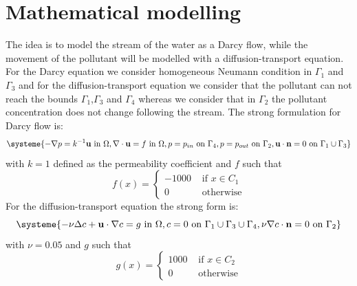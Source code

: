 \documentclass[]{report}
\begin{document}
\section{Mathematical modelling}
The idea is to model the stream of the water as a Darcy flow, while the movement of the pollutant will be modelled with a diffusion-transport equation.
For the Darcy equation we consider homogeneous Neumann condition in $\Gamma_1$ and $\Gamma_3$ and for the diffusion-transport equation we consider that the pollutant can not reach the bounds $\Gamma_1$,$\Gamma_3$ and $\Gamma_4$ whereas we consider that in $\Gamma_2$ the pollutant concentration does not change following the stream.
The strong formulation for Darcy flow is:
\begin{equation}
\systeme{-\nabla p=k^{-1}\mathbf{u} \mbox{ in }\Omega,\nabla \cdot \mathbf{u}=f \mbox{ in } \Omega,p=p_{in} \mbox{ on }\Gamma_4,p=p_{out}\mbox{ on } \Gamma_2, \mathbf{u}\cdot \mathbf{n}=0 \mbox{ on } \Gamma_1\cup\Gamma_3}
\end{equation}
with $k=1$ defined as the permeability coefficient and $f$ such that
\begin{equation}
	f(x)=\begin{cases}
	-1000& \mbox{ if }x\in C_1\\
	0& \mbox{ otherwise}
	\end{cases}
\end{equation}
For the diffusion-transport equation the strong form is:
\begin{equation}
\systeme{-\nu\Delta c+\mathbf{u}\cdot \nabla c=g \mbox{ in } \Omega,c=0 \mbox{ on }\Gamma_1\cup\Gamma_3\cup\Gamma_4,\nu\nabla c\cdot\mathbf{n}=0 \mbox{ on }\Gamma_2}
\end{equation}
with $\nu=0.05$ and $g$ such that
\begin{equation}
g(x)=\begin{cases}
1000& \mbox{ if }x\in C_2\\
0& \mbox{ otherwise}
\end{cases}
\end{equation}
\end{document}
